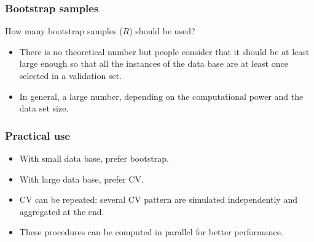 \begin{frame}
\frametitle{Bootstrap samples}
\begin{center}
How many bootstrap samples ($R$) should be used?
\end{center} 
\begin{itemize}
\item There is no theoretical number but people consider that it should be at least large enough so that all the instances of the data base are at least once selected in a validation set.
\item In general, a large number, depending on the computational power and the data set size. 
\end{itemize}
\end{frame}
\begin{frame}
\frametitle{Practical use}
\begin{itemize}
\item With small data base, prefer bootstrap.
\item With large data base, prefer CV.
\item CV can be repeated: several CV pattern are simulated independently and aggregated at the end. 
\item These procedures can be computed in parallel for better performance.
\end{itemize}
\end{frame}
